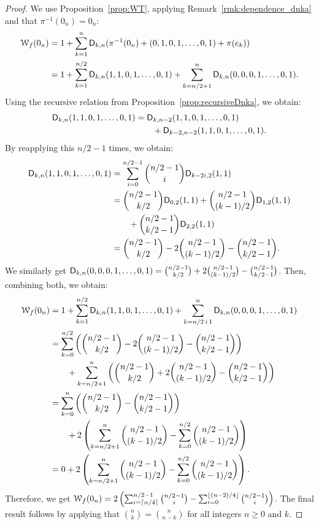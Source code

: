 \documentclass{llncs}
\begin{document}
\begin{proof}
	We use Proposition~\ref{prop:WT}, applying Remark~\ref{rmk:dependence_dnka} and that $\pi^{-1}(0_n)=0_n$:
	\begin{align*}
		\wt{f}(0_n)&=1+\sum_{k=1}^n\Dnka{n}{k}{\pi^{-1}(0_n)+(0,1,0,1,\ldots,0,1)+\pi(e_k)}\\
		&=1+\sum_{k=1}^{n/2}\Dnka{n}{k}{1,1,0,1,\ldots,0,1}+\sum_{k=n/2+1}^{n}\Dnka{n}{k}{0,0,0,1,\ldots,0,1}.
	\end{align*}
	Using the recursive relation from Proposition~\ref{prop:recursiveDnka}, we obtain:
	\begin{align*}
		\Dnka{n}{k}{1,1,0,1,\ldots,0,1}&=\Dnka{n-2}{k}{1,1,0,1,\ldots,0,1}\\
		&\qquad+\Dnka{n-2}{k-2}{1,1,0,1,\ldots,0,1}.
	\end{align*}
	By reapplying this $n/2-1$ times, we obtain:
	\begin{align*}
		\Dnka{n}{k}{1,1,0,1,\ldots,0,1}&=\sum_{i=0}^{n/2-1} \binom{n/2-1}{i} \Dnka{2}{k-2i}{1,1}\\
		&=\binom{n/2-1}{k/2} \Dnka{2}{0}{1,1}+ \binom{n/2-1}{(k-1)/2} \Dnka{2}{1}{1,1}\\
		&\qquad+ \binom{n/2-1}{k/2-1} \Dnka{2}{2}{1,1}\\
		&=\binom{n/2-1}{k/2}-2\binom{n/2-1}{(k-1)/2}-\binom{n/2-1}{k/2-1}.
	\end{align*}
	We similarly get $\Dnka{n}{k}{0,0,0,1,\ldots,0,1}=\binom{n/2-1}{k/2} +2 \binom{n/2-1}{(k-1)/2}-\binom{n/2-1}{k/2-1}$. Then, combining both, we obtain:
	\begin{align*}
		\wt{f}(0_n)&=1+\sum_{k=1}^{n/2}\Dnka{n}{k}{1,1,0,1,\ldots,0,1}+ \sum_{k=n/2+1}^{n}\Dnka{n}{k}{0,0,0,1,\ldots,0,1}\\
		&=\sum_{k=0}^{n/2} \left(\binom{n/2-1}{k/2} -2 \binom{n/2-1}{(k-1)/2}-\binom{n/2-1}{k/2-1}\right)\\
		&\qquad+\sum_{k=n/2+1}^{n}\left(\binom{n/2-1}{k/2}+2\binom{n/2-1}{(k-1)/2}-\binom{n/2-1}{k/2-1}\right)\\
		&=\sum_{k=0}^{n}\left( \binom{n/2-1}{k/2}-\binom{n/2-1}{k/2-1}\right)\\
		&\qquad+2\left(\sum_{k=n/2+1}^{n}\binom{n/2-1}{(k-1)/2}-\sum_{k=0}^{n/2}\binom{n/2-1}{(k-1)/2}\right)\\
		&=0+2\left(\sum_{k=n/2+1}^{n}\binom{n/2-1}{(k-1)/2}-\sum_{k=0}^{n/2} \binom{n/2-1}{(k-1)/2}\right).
	\end{align*}
	Therefore, we get $\wt{f}(0_n)=2\left(\sum_{i=\lceil n/4\rceil}^{n/2-1} \binom {n/2-1}{i} - \sum_{i=0}^{\lfloor(n-2)/4\rfloor} \binom{n/2-1}{i}\right)$. The final result follows by applying that $\binom{n}{k}=\binom{n}{n-k}$ for all integers $n\geq 0$ and $k$.
\end{proof}
\end{document}
